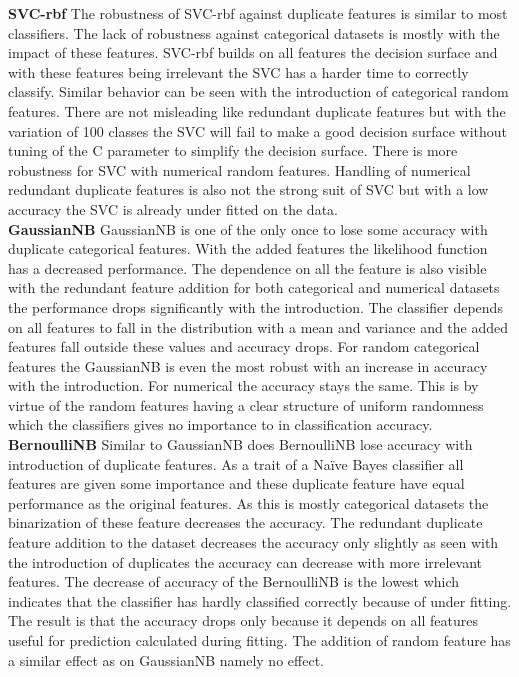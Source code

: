 \documentclass[a4paper,10pt]{article}
\begin{document}
\textbf{SVC-rbf} The robustness of SVC-rbf against duplicate features is similar to most classifiers. The lack of robustness against categorical datasets is mostly with the impact of these features. SVC-rbf builds on all features the decision surface and with these features being irrelevant the SVC has a harder time to correctly classify. Similar behavior can be seen with the introduction of categorical random features. There are not misleading like redundant duplicate features but with the variation of 100 classes the SVC will fail to make a good decision surface without tuning of the C parameter to simplify the decision surface. There is more robustness for SVC with numerical random features. Handling of numerical redundant duplicate features is also not the strong suit of SVC but with a low accuracy the SVC is already under fitted on the data.  \\

\textbf{GaussianNB} GaussianNB is one of the only once to lose some accuracy with duplicate categorical features. With the added features the likelihood function has a decreased performance. The dependence on all the feature is also visible with the redundant feature addition for both categorical and numerical datasets the performance drops significantly with the introduction. The classifier depends on all features to fall in the distribution with a mean and variance and the added features fall outside these values and accuracy drops. For random categorical features the GaussianNB is even the most robust with an increase in accuracy with the introduction. For numerical the accuracy stays the same. This is by virtue of the random features having a clear structure of uniform randomness which the classifiers gives no importance to in classification accuracy.   \\

\textbf{BernoulliNB} Similar to GaussianNB does BernoulliNB lose accuracy with introduction of duplicate features. As a trait of a Naïve Bayes classifier all features are given some importance and these duplicate feature have equal performance as the original features. As this is mostly categorical datasets  the binarization of these feature decreases the accuracy. The redundant duplicate feature addition to the dataset decreases the accuracy only slightly as seen with the introduction of duplicates the accuracy can decrease with more irrelevant features. The decrease of accuracy of the BernoulliNB is the lowest which indicates that the classifier has hardly classified correctly because of under fitting. The result is that the accuracy drops only because it depends on all features useful for prediction calculated during fitting. The addition of random feature has a similar effect as on GaussianNB namely no effect. \\
\end{document}
